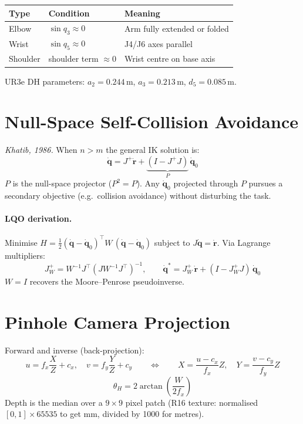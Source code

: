 \documentclass[11pt,a4paper]{article}
\begin{document}
\begin{center}
\begin{tabular}{lll}
\toprule
\textbf{Type} & \textbf{Condition} & \textbf{Meaning} \\
\midrule
Elbow    & $\sin q_3 \approx 0$ & Arm fully extended or folded \\
Wrist    & $\sin q_5 \approx 0$ & J4/J6 axes parallel \\
Shoulder & shoulder term $\approx 0$ & Wrist centre on base axis \\
\bottomrule
\end{tabular}
\end{center}

UR3e DH parameters: $a_2 = 0.244\,\text{m}$, $a_3 = 0.213\,\text{m}$, $d_5 = 0.085\,\text{m}$.

\section{Null-Space Self-Collision Avoidance}

\textit{Khatib, 1986.} When $n > m$ the general IK solution is:
\[
\dot{\mathbf{q}} = J^+\dot{\mathbf{r}} + \underbrace{(I - J^+J)}_{P}\,\dot{\mathbf{q}}_0
\]
$P$ is the null-space projector ($P^2 = P$). Any $\dot{\mathbf{q}}_0$ projected through $P$
pursues a secondary objective (e.g.\ collision avoidance) without disturbing the task.

\paragraph{LQO derivation.}
Minimise $H = \tfrac{1}{2}(\dot{\mathbf{q}} - \dot{\mathbf{q}}_0)^\top W\,(\dot{\mathbf{q}} - \dot{\mathbf{q}}_0)$
subject to $J\dot{\mathbf{q}} = \dot{\mathbf{r}}$. Via Lagrange multipliers:
\[
J^+_W = W^{-1}J^\top(J W^{-1}J^\top)^{-1}, \qquad
\dot{\mathbf{q}}^* = J^+_W\,\dot{\mathbf{r}} + (I - J^+_W J)\,\dot{\mathbf{q}}_0
\]
$W = I$ recovers the Moore–Penrose pseudoinverse.

\section{Pinhole Camera Projection}

Forward and inverse (back-projection):
\[
u = f_x\frac{X}{Z} + c_x, \quad v = f_y\frac{Y}{Z} + c_y
\qquad\Longleftrightarrow\qquad
X = \frac{u-c_x}{f_x}Z, \quad Y = \frac{v-c_y}{f_y}Z
\]
\[
\theta_H = 2\arctan\!\left(\frac{W}{2f_x}\right)
\]
Depth is the median over a $9\times9$ pixel patch (R16 texture: normalised $[0,1]
\times 65535$ to get mm, divided by 1000 for metres).
\end{document}
